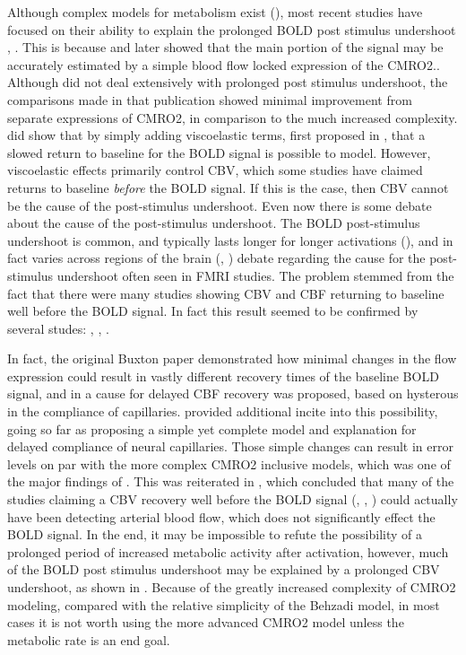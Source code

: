 \documentclass{article}
\begin{document}
Although complex
models for metabolism exist (\cite{Zheng2005}), most recent studies have
focused on their ability to explain the prolonged BOLD post stimulus 
undershoot \cite{Donahue2009}, \cite{Yacoub2006}. This is because \cite{Buxton2004}
and later \cite{Riera2004} showed that the main portion of the signal may be 
accurately estimated by a simple blood flow locked expression of the CMRO2.. 
Although \cite{Deneux2006} did not deal extensively with prolonged post
stimulus undershoot, the comparisons made in that publication showed minimal
improvement from separate expressions of CMRO2, in comparison to the much 
increased complexity. \cite{Deneux2006} did show that by simply adding viscoelastic
terms, first proposed in \cite{Buxton2004}, that a slowed return to baseline for
the BOLD signal is possible to model. However, viscoelastic effects primarily
control CBV, which some studies have claimed returns to baseline \emph{before}
the BOLD signal. If this is the case, then CBV cannot be the cause of the 
post-stimulus undershoot. Even now there is some debate about the cause of 
the post-stimulus undershoot. The BOLD post-stimulus undershoot is common,
and typically lasts longer for longer activations (\cite{Chen2009}), and in
fact varies across regions of the brain (\cite{Mandeville2001}, \cite{Yacoub2006})
debate regarding the cause for the post-stimulus undershoot often seen in 
FMRI studies. The problem stemmed from the fact that there were many studies
showing CBV and CBF returning to baseline well before the BOLD signal. In fact
this result seemed to be confirmed by several studes: \cite{Frahm2008}, \cite{Donahue2009}, 
\cite{Lu2004}. 


In fact, the original Buxton
paper demonstrated how minimal changes in the flow expression could
result in vastly different recovery times of the baseline BOLD signal, and
in \cite{Mandeville1999} a cause for delayed CBF recovery was proposed, based
on hysterous in the compliance of capillaries. \cite{Behzadi2005} provided
additional incite into this possibility, going so far as proposing a simple
yet complete model and explanation for delayed compliance of neural capillaries.
Those simple changes can result in error levels on par with the more 
complex CMRO2 inclusive models, which was one of the major findings of \cite{Deneux2006}. 
This was reiterated in \cite{Chen2009}, which concluded that many of
the studies claiming a CBV recovery well before the BOLD signal 
(\cite{Frahm1996}, \cite{Kruger1998}, \cite{Lu2004}) 
could actually have been detecting arterial blood flow, which does not significantly effect the
BOLD signal. 
In the end, it may be impossible to refute the
possibility of a prolonged period of increased metabolic activity after activation,
however, much of the BOLD post stimulus undershoot may be explained by a 
prolonged CBV undershoot, as shown in \cite{Chen2009}. Because of the greatly
increased complexity of CMRO2 modeling, compared with the relative simplicity
of the Behzadi model, in most cases it is not worth using the more advanced CMRO2
model unless the metabolic rate is an end goal. 
\end{document}
